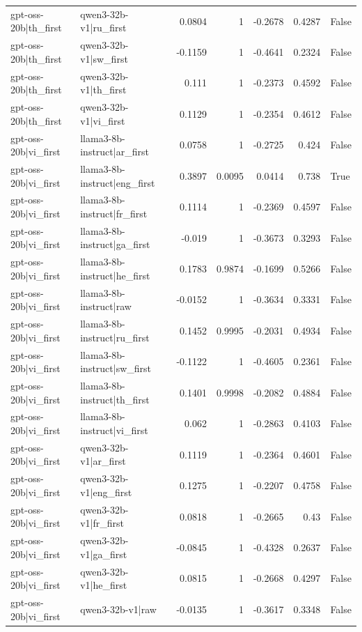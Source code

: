 \begin{table}
\begin{tabular}{l l r r r r l}
gpt-oss-20b|th_first & qwen3-32b-v1|ru_first & 0.0804 & 1 & -0.2678 & 0.4287 & False \\
gpt-oss-20b|th_first & qwen3-32b-v1|sw_first & -0.1159 & 1 & -0.4641 & 0.2324 & False \\
gpt-oss-20b|th_first & qwen3-32b-v1|th_first & 0.111 & 1 & -0.2373 & 0.4592 & False \\
gpt-oss-20b|th_first & qwen3-32b-v1|vi_first & 0.1129 & 1 & -0.2354 & 0.4612 & False \\
gpt-oss-20b|vi_first & llama3-8b-instruct|ar_first & 0.0758 & 1 & -0.2725 & 0.424 & False \\
gpt-oss-20b|vi_first & llama3-8b-instruct|eng_first & 0.3897 & 0.0095 & 0.0414 & 0.738 & True \\
gpt-oss-20b|vi_first & llama3-8b-instruct|fr_first & 0.1114 & 1 & -0.2369 & 0.4597 & False \\
gpt-oss-20b|vi_first & llama3-8b-instruct|ga_first & -0.019 & 1 & -0.3673 & 0.3293 & False \\
gpt-oss-20b|vi_first & llama3-8b-instruct|he_first & 0.1783 & 0.9874 & -0.1699 & 0.5266 & False \\
gpt-oss-20b|vi_first & llama3-8b-instruct|raw & -0.0152 & 1 & -0.3634 & 0.3331 & False \\
gpt-oss-20b|vi_first & llama3-8b-instruct|ru_first & 0.1452 & 0.9995 & -0.2031 & 0.4934 & False \\
gpt-oss-20b|vi_first & llama3-8b-instruct|sw_first & -0.1122 & 1 & -0.4605 & 0.2361 & False \\
gpt-oss-20b|vi_first & llama3-8b-instruct|th_first & 0.1401 & 0.9998 & -0.2082 & 0.4884 & False \\
gpt-oss-20b|vi_first & llama3-8b-instruct|vi_first & 0.062 & 1 & -0.2863 & 0.4103 & False \\
gpt-oss-20b|vi_first & qwen3-32b-v1|ar_first & 0.1119 & 1 & -0.2364 & 0.4601 & False \\
gpt-oss-20b|vi_first & qwen3-32b-v1|eng_first & 0.1275 & 1 & -0.2207 & 0.4758 & False \\
gpt-oss-20b|vi_first & qwen3-32b-v1|fr_first & 0.0818 & 1 & -0.2665 & 0.43 & False \\
gpt-oss-20b|vi_first & qwen3-32b-v1|ga_first & -0.0845 & 1 & -0.4328 & 0.2637 & False \\
gpt-oss-20b|vi_first & qwen3-32b-v1|he_first & 0.0815 & 1 & -0.2668 & 0.4297 & False \\
gpt-oss-20b|vi_first & qwen3-32b-v1|raw & -0.0135 & 1 & -0.3617 & 0.3348 & False \\

\end{tabular}
\end{table}
